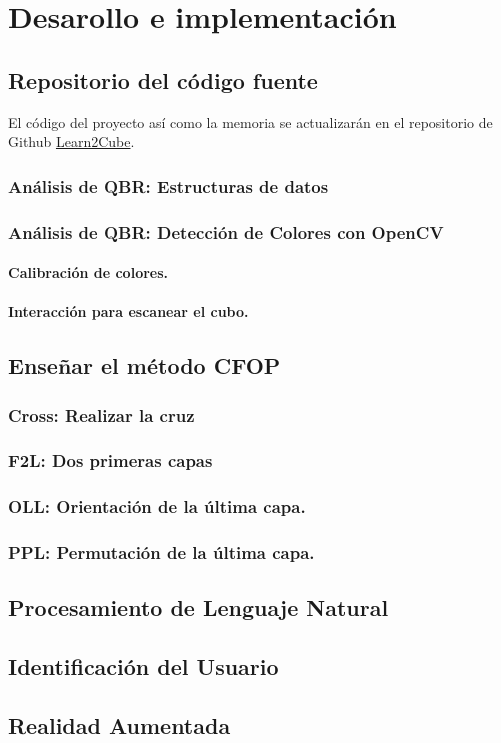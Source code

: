 \chapter{Desarollo e implementación}

\section{Repositorio del código fuente}

El código del proyecto así como la memoria se actualizarán en el repositorio 
de Github \href{http://github.com/eigenric/learn2cube}{Learn2Cube}.

\subsection{Análisis de QBR: Estructuras de datos}
\subsection{Análisis de QBR: Detección de Colores con OpenCV}
    \subsubsection{Calibración de colores.}
    \subsubsection{Interacción para escanear el cubo.}

\section{Enseñar el método CFOP}

\subsection{Cross: Realizar la cruz}
\subsection{F2L: Dos primeras capas}
\subsection{OLL: Orientación de la última capa.}
\subsection{PPL: Permutación de la última capa.}

\section{Procesamiento de Lenguaje Natural}

\section{Identificación del Usuario}

\section{Realidad Aumentada}